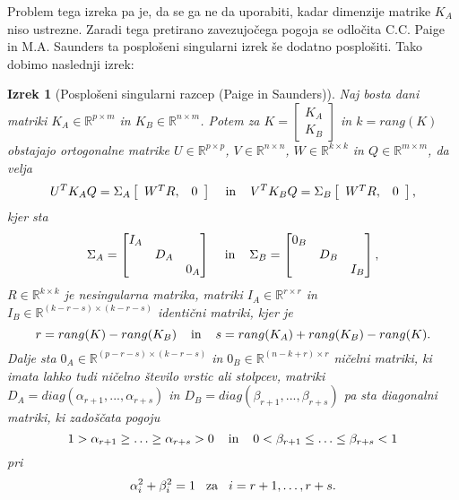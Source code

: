 \documentclass[mat1]{article}
\newtheorem{izrek}{Izrek}
\theoremstyle{definition}
\begin{document}
Problem tega izreka pa je, da se ga ne da uporabiti, kadar dimenzije matrike $K_A$ niso ustrezne. Zaradi tega pretirano zavezujočega pogoja se odločita C.C. Paige in M.A. Saunders \cite{GSVD-2} ta posplošeni singularni izrek še dodatno posplošiti. Tako dobimo naslednji izrek:
\begin{izrek}[Posplošeni singularni razcep (Paige in Saunders)]\label{GSVD2}
\label{izrek:GSVD} Naj bosta dani matriki $K_A \in \mathbb{R}^{p \times m}$ in $K_B \in \mathbb{R}^{n \times m}$. Potem za $K = \left[\begin{array}{c} K_A \\ K_B \end{array}\right]$ in $k = rang(K)$ obstajajo ortogonalne matrike $U \in \mathbb{R}^{p \times p}$, $V \in \mathbb{R}^{n \times n}$, $W \in \mathbb{R}^{k \times k}$ in $Q \in \mathbb{R}^{m \times m}$, da velja 
\begin{equation} \label{eq4}
U^T K_A Q = \Sigma_A  \left[\begin{array}{cc} W^T R, & 0 \end{array}\right] \hspace{4mm} \text{in} \hspace{4mm} V^T K_B Q = \Sigma_B  \left[\begin{array}{cc} W^T R, & 0 \end{array}\right] \text{,}
\end{equation} kjer sta
$$\Sigma_A = \begin{bmatrix} 
I_A &  & \\
 & D_A & \\
 & & 0_A  
\end{bmatrix} \hspace{4mm} \text{in} \hspace{4mm}
\Sigma_B = \begin{bmatrix} 
0_B &  & \\
 & D_B & \\
 & & I_B  
\end{bmatrix} \text{,}$$ 
$R \in \mathbb{R}^{k \times k}$ je nesingularna matrika, matriki $I_A \in \mathbb{R}^{r \times r}$ in $I_B \in \mathbb{R}^{(k-r-s) \times (k-r-s)}$ identični matriki, kjer je 
$$r = rang(K) - rang(K_B) \hspace{4mm} \text{in} \hspace{4mm} s = rang(K_A) + rang(K_B) - rang(K) \text{.}$$
Dalje sta $0_A \in \mathbb{R}^{(p-r-s) \times (k-r-s)}$ in $0_B \in \mathbb{R}^{(n-k+r) \times r}$ ničelni matriki, ki imata lahko tudi ničelno število vrstic ali stolpcev, matriki
$D_A = diag(\alpha_{r+1},..., \alpha_{r+s})$ in $D_B = diag(\beta_{r+1},..., \beta_{r+s})$ pa sta diagonalni matriki, ki zadoščata pogoju
$$1 > \alpha_{r+1} \geq \ldots \geq \alpha_{r+s} > 0 \hspace{4mm} \text{in} \hspace{4mm} 0 < \beta_{r+1} \leq \ldots \leq \beta_{r+s} < 1$$
pri
\begin{equation} \label{alpha+beta-GSVD}
\alpha_i^2 + \beta_i^2 = 1 \hspace{3mm} \text{za} \hspace{3mm} i = r+1,\ldots, r+s
\text{.}
\end{equation}
\end{izrek}
\end{document}
